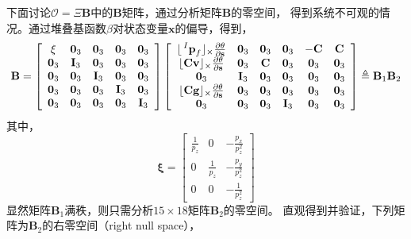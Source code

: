 \documentclass{article}
\begin{document}
\par
下面讨论$\mathcal{O}=\Xi\textbf{B}$中的$\textbf{B}$矩阵，通过分析矩阵$\textbf{B}$的零空间，
得到系统不可观的情况。通过堆叠基函数$\beta$对状态变量$\textbf{x}$的偏导，得到，
\begin{equation}
    \textbf{B}=\left[\begin{array}{ccccc}
    \mathbf{\xi}&\textbf{0}_3&\textbf{0}_3&\textbf{0}_3&\textbf{0}_3\\
    \textbf{0}_3&\textbf{I}_3&\textbf{0}_3&\textbf{0}_3&\textbf{0}_3\\
    \textbf{0}_3&\textbf{0}_3&\textbf{I}_3&\textbf{0}_3&\textbf{0}_3\\
    \textbf{0}_3&\textbf{0}_3&\textbf{0}_3&\textbf{I}_3&\textbf{0}_3\\
    \textbf{0}_3&\textbf{0}_3&\textbf{0}_3&\textbf{0}_3&\textbf{I}_3
    \end{array}\right]
    \left[\begin{array}{cccccc}
        \lfloor\sideset{^I}{}{\mathop{\textbf{p}_f}}\rfloor_{\times}\frac{\partial\mathbf{\theta}}{\partial\textbf{s}}&\textbf{0}_3&\textbf{0}_3&\textbf{0}_3&-\textbf{C}&\textbf{C}\\
        \lfloor\textbf{Cv}\rfloor_{\times}\frac{\partial\mathbf{\theta}}{\partial\textbf{s}}&\textbf{0}_3&\textbf{C}&\textbf{0}_3&\textbf{0}_3&\textbf{0}_3\\
        \textbf{0}_3&\textbf{I}_3&\textbf{0}_3&\textbf{0}_3&\textbf{0}_3&\textbf{0}_3\\
        \lfloor\textbf{Cg}\rfloor_{\times}\frac{\partial\mathbf{\theta}}{\partial\textbf{s}}&\textbf{0}_3&\textbf{0}_3&\textbf{0}_3&\textbf{0}_3&\textbf{0}_3\\
        \textbf{0}_3&\textbf{0}_3&\textbf{0}_3&\textbf{I}_3&\textbf{0}_3&\textbf{0}_3
    \end{array}\right]
    \triangleq \textbf{B}_{1}\textbf{B}_{2}
\end{equation}
其中，
\begin{equation}
    \mathbf{\xi}=\left[\begin{array}{ccc}
        \frac{1}{p_z}&0&-\frac{p_x}{p_z^2}\\
        0&\frac{1}{p_z}&-\frac{p_y}{p_z^2}\\
        0&0&-\frac{1}{p_z^2}
    \end{array}\right]
\end{equation}
显然矩阵$\textbf{B}_1$满秩，则只需分析$15\times 18$矩阵$\textbf{B}_2$的零空间。
直观得到并验证，下列矩阵为$\textbf{B}_2$的右零空间（right null space），
\end{document}

